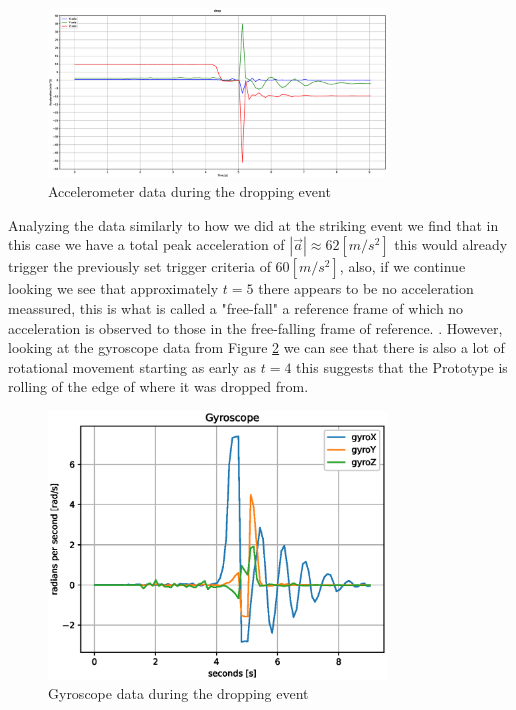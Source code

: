 \documentclass[../main.tex]{subfiles}
\begin{document}
\begin{figure}[htbp]
    \centering
    \includegraphics[width=0.8\textwidth]{resources/figures/Acceleration_drop.eps}
    \caption{Accelerometer data during the dropping event}
    \label{fig:accelerometer_dropping}
\end{figure}

Analyzing the data similarly to how we did at the striking event we find that in this case we have a total peak acceleration of $|\overrightarrow{a}| \approx 62 [m/s^2]$ this would already trigger the previously set trigger criteria of $60 [m/s^2]$, also, if we continue looking we see that approximately $t=5$ there appears to be no acceleration meassured, this is what is called a "free-fall" a reference frame of which no acceleration is observed to those in the free-falling frame of reference. \cite{Freefall_Encyclopædia_Britannica_2024}. However, looking at the gyroscope data from Figure \ref{fig:gyroscope_dropping} we can see that there is also a lot of rotational movement starting as early as $t=4$ this suggests that the Prototype is rolling of the edge of where it was dropped from.

\begin{figure}[htbp]
    \centering
    \includegraphics[width=0.8\textwidth]{resources/figures/Gyro_drop.eps}
    \caption{Gyroscope data during the dropping event}
    \label{fig:gyroscope_dropping}
\end{figure}
\end{document}
